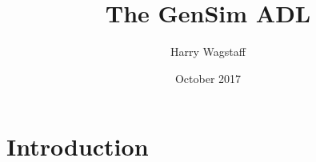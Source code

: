 \documentclass{beamer}
\title %
{The GenSim ADL}
\author %
{Harry Wagstaff}
\institute %
{
	Institute for Computing Systems Architecture \\
	University of Edinburgh
}
\date %
{October 2017}
\begin{document}
	
\begin{frame}
  \titlepage
\end{frame}

\begin{frame}
	\tableofcontents
\end{frame}	

	
	

\section{Introduction}
\end{document}
